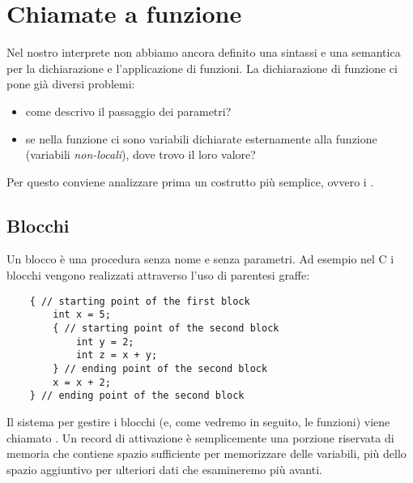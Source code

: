 \section{Chiamate a funzione}

Nel nostro interprete non abbiamo ancora definito una sintassi e una semantica per la dichiarazione e l'applicazione di funzioni. La dichiarazione di funzione ci pone già diversi problemi:
\begin{itemize}
    \item come descrivo il passaggio dei parametri?
    \item se nella funzione ci sono variabili dichiarate esternamente alla funzione (variabili \emph{non-locali}), dove trovo il loro valore?
\end{itemize}

Per questo conviene analizzare prima un costrutto più semplice, ovvero i .

\subsection{Blocchi}

Un blocco è una procedura senza nome e senza parametri. Ad esempio nel C i blocchi vengono realizzati attraverso l'uso di parentesi graffe:
\begin{verbatim}
    { // starting point of the first block
        int x = 5;
        { // starting point of the second block
            int y = 2;
            int z = x + y;
        } // ending point of the second block
        x = x + 2;
    } // ending point of the second block
\end{verbatim}

Il sistema per gestire i blocchi (e, come vedremo in seguito, le funzioni) viene chiamato .
Un record di attivazione è semplicemente una porzione riservata di memoria che contiene spazio sufficiente per memorizzare delle variabili, più dello spazio aggiuntivo per ulteriori dati che esamineremo più avanti.

